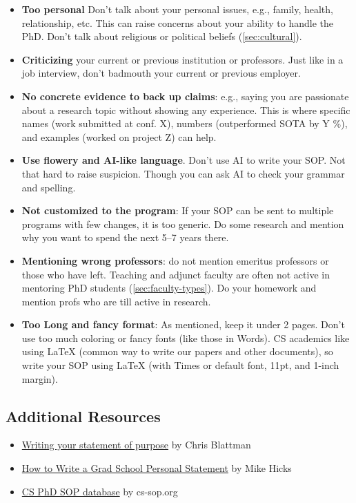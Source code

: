 \documentclass[oneside,11pt,dvipsnames]{book}
\begin{document}
\begin{itemize}
\item \textbf{Too personal} Don't talk about your personal issues, e.g., family, health, relationship, etc. This can raise concerns about your ability to handle the PhD. Don't talk about religious or political beliefs (\autoref{sec:cultural}).
\item \textbf{Criticizing} your current or previous institution or professors. Just like in a job interview, don't badmouth your current or previous employer. 
\item \textbf{No concrete evidence to back up claims}: e.g., saying you are passionate about a research topic without showing any experience. This is where specific names (work submitted at conf. X), numbers (outperformed SOTA by Y \%), and examples (worked on project Z) can help. 
\item \textbf{Use flowery and AI-like language}. Don't use AI to write your SOP. Not that hard to raise suspicion. Though you can ask AI to check your grammar and spelling.
\item \textbf{Not customized to the program}: If your SOP can be sent to multiple programs with few changes, it is too generic. Do some research and mention why you want to spend the next 5--7 years there.
\item \textbf{Mentioning wrong professors}: do not mention emeritus professors or those who have left.  Teaching and adjunct faculty are often not active in mentoring PhD students (\autoref{sec:faculty-types}). Do your homework and mention profs who are till active in research. 
\item \textbf{Too Long and fancy format}: As mentioned, keep it under 2 pages. Don't use too much coloring or fancy fonts (like those in Words). CS academics like using LaTeX (common way to write our papers and other documents), so write your SOP using LaTeX (with Times or default font, 11pt, and 1-inch margin).
\end{itemize}


\subsection*{Additional Resources}
\begin{itemize}
    \item \href{https://chrisblattman.com/blog/2022/01/11/}{Writing your statement of purpose} by Chris Blattman
  \item \href{http://www.pl-enthusiast.net/2022/10/03/how-to-write-a-grad-school-personal-statement/}{How to Write a Grad School Personal Statement} by Mike Hicks
  \item     \href{https://cs-sop.notion.site/cs-sop/CS-PhD-Statements-of-Purpose-df39955313834889b7ac5411c37b958d?p=f5d5980a71524ebaa4e6ae57266b847c&pm=s}{CS PhD SOP database} by cs-sop.org
\end{itemize}
\end{document}
